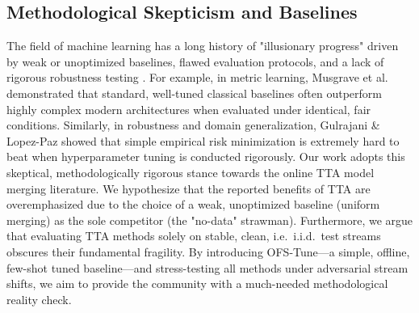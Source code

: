\subsection{Methodological Skepticism and Baselines}
The field of machine learning has a long history of "illusionary progress" driven by weak or unoptimized baselines, flawed evaluation protocols, and a lack of rigorous robustness testing \cite{bulo2017loss, musgrave2020metric, liao2021are}. For example, in metric learning, Musgrave et al.\ \cite{musgrave2020metric} demonstrated that standard, well-tuned classical baselines often outperform highly complex modern architectures when evaluated under identical, fair conditions. Similarly, in robustness and domain generalization, Gulrajani \& Lopez-Paz \cite{gulrajani2020in} showed that simple empirical risk minimization is extremely hard to beat when hyperparameter tuning is conducted rigorously.
Our work adopts this skeptical, methodologically rigorous stance towards the online TTA model merging literature. We hypothesize that the reported benefits of TTA are overemphasized due to the choice of a weak, unoptimized baseline (uniform merging) as the sole competitor (the "no-data" strawman). Furthermore, we argue that evaluating TTA methods solely on stable, clean, i.e.\ i.i.d.\ test streams obscures their fundamental fragility. By introducing OFS-Tune---a simple, offline, few-shot tuned baseline---and stress-testing all methods under adversarial stream shifts, we aim to provide the community with a much-needed methodological reality check.
